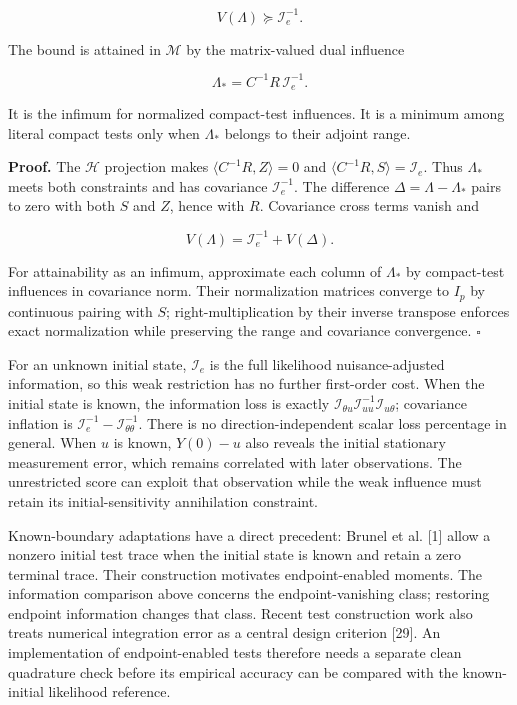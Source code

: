 \documentclass[
  american,
  11pt,
]{article}
\begin{document}
\[
V(\Lambda)\succeq\mathcal I_e^{-1}.
\]

The bound is attained in \(\mathcal M\) by the matrix-valued dual
influence

\[
\Lambda_*=C^{-1}R\,\mathcal I_e^{-1}.
\]

It is the infimum for normalized compact-test influences. It is a
minimum among literal compact tests only when \(\Lambda_*\) belongs to
their adjoint range.

\textbf{Proof.} The \(\mathcal H\) projection makes
\(\langle C^{-1}R,Z\rangle=0\) and
\(\langle C^{-1}R,S\rangle=\mathcal I_e\). Thus \(\Lambda_*\) meets both
constraints and has covariance \(\mathcal I_e^{-1}\). The difference
\(\Delta=\Lambda-\Lambda_*\) pairs to zero with both \(S\) and \(Z\),
hence with \(R\). Covariance cross terms vanish and

\[
V(\Lambda)=\mathcal I_e^{-1}+V(\Delta).
\]

For attainability as an infimum, approximate each column of
\(\Lambda_*\) by compact-test influences in covariance norm. Their
normalization matrices converge to \(I_p\) by continuous pairing with
\(S\); right-multiplication by their inverse transpose enforces exact
normalization while preserving the range and covariance convergence.
\(\square\)

For an unknown initial state, \(\mathcal I_e\) is the full likelihood
nuisance-adjusted information, so this weak restriction has no further
first-order cost. When the initial state is known, the information loss
is exactly
\(\mathcal I_{\theta u}\mathcal I_{uu}^{-1}\mathcal I_{u\theta}\);
covariance inflation is
\(\mathcal I_e^{-1}-\mathcal I_{\theta\theta}^{-1}\). There is no
direction-independent scalar loss percentage in general. When \(u\) is
known, \(Y(0)-u\) also reveals the initial stationary measurement error,
which remains correlated with later observations. The unrestricted score
can exploit that observation while the weak influence must retain its
initial-sensitivity annihilation constraint.

Known-boundary adaptations have a direct precedent: Brunel et al.
{[}1{]} allow a nonzero initial test trace when the initial state is
known and retain a zero terminal trace. Their construction motivates
endpoint-enabled moments. The information comparison above concerns the
endpoint-vanishing class; restoring endpoint information changes that
class. Recent test construction work also treats numerical integration
error as a central design criterion {[}29{]}. An implementation of
endpoint-enabled tests therefore needs a separate clean quadrature check
before its empirical accuracy can be compared with the known-initial
likelihood reference.
\end{document}
